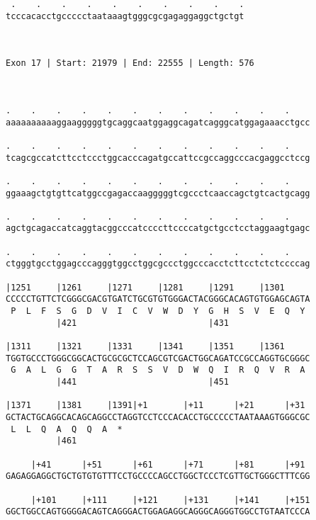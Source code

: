 \documentclass{article}
\begin{document}
\begin{Verbatim}
 .    .    .    .    .    .    .    .    .    .
tcccacacctgccccctaataaagtgggcgcgagaggaggctgctgt
                                               
                                               
 
Exon 17 | Start: 21979 | End: 22555 | Length: 576



.    .    .    .    .    .    .    .    .    .    .    .    
aaaaaaaaaaggaagggggtgcaggcaatggaggcagatcagggcatggagaaacctgcc
                                                            
.    .    .    .    .    .    .    .    .    .    .    .    
tcagcgccatcttcctccctggcacccagatgccattccgccaggcccacgaggcctccg
                                                            
.    .    .    .    .    .    .    .    .    .    .    .    
ggaaagctgtgttcatggccgagaccaagggggtcgccctcaaccagctgtcactgcagg
                                                            
.    .    .    .    .    .    .    .    .    .    .    .    
agctgcagaccatcaggtacggcccatccccttccccatgctgcctcctaggaagtgagc
                                                            
.    .    .    .    .    .    .    .    .    .    .    .    
ctgggtgcctggagcccagggtggcctggcgccctggcccacctcttcctctctccccag
                                                            
|1251     |1261     |1271     |1281     |1291     |1301     
CCCCCTGTTCTCGGGCGACGTGATCTGCGTGTGGGACTACGGGCACAGTGTGGAGCAGTA
 P  L  F  S  G  D  V  I  C  V  W  D  Y  G  H  S  V  E  Q  Y 
          |421                          |431                
  
|1311     |1321     |1331     |1341     |1351     |1361     
TGGTGCCCTGGGCGGCACTGCGCGCTCCAGCGTCGACTGGCAGATCCGCCAGGTGCGGGC
 G  A  L  G  G  T  A  R  S  S  V  D  W  Q  I  R  Q  V  R  A 
          |441                          |451                
  
|1371     |1381     |1391|+1       |+11      |+21      |+31 
GCTACTGCAGGCACAGCAGGCCTAGGTCCTCCCACACCTGCCCCCTAATAAAGTGGGCGC
 L  L  Q  A  Q  Q  A  *   
          |461                                              
  
     |+41      |+51      |+61      |+71      |+81      |+91 
GAGAGGAGGCTGCTGTGTGTTTCCTGCCCCAGCCTGGCTCCCTCGTTGCTGGGCTTTCGG
                                                            
     |+101     |+111     |+121     |+131     |+141     |+151
GGCTGGCCAGTGGGGACAGTCAGGGACTGGAGAGGCAGGGCAGGGTGGCCTGTAATCCCA
                                                            

\end{Verbatim}
\end{document}
